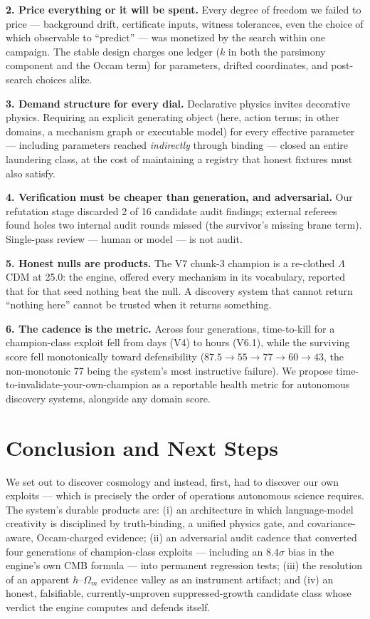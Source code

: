 \documentclass[journal]{IEEEtran}
\begin{document}
\textbf{2. Price everything or it will be spent.} Every degree of freedom we failed to
price --- background drift, certificate inputs, witness tolerances, even the choice of
which observable to ``predict'' --- was monetized by the search within one campaign.
The stable design charges one ledger ($k$ in both the parsimony component and the
Occam term) for parameters, drifted coordinates, and post-search choices alike.

\textbf{3. Demand structure for every dial.} Declarative physics invites decorative
physics. Requiring an explicit generating object (here, action terms; in other domains,
a mechanism graph or executable model) for every effective parameter --- including
parameters reached \emph{indirectly} through binding --- closed an entire laundering
class, at the cost of maintaining a registry that honest fixtures must also satisfy.

\textbf{4. Verification must be cheaper than generation, and adversarial.} Our refutation
stage discarded 2 of 16 candidate audit findings; external referees found holes two
internal audit rounds missed (the survivor's missing brane term). Single-pass review ---
human or model --- is not audit.

\textbf{5. Honest nulls are products.} The V7 chunk-3 champion is a re-clothed
$\Lambda$CDM at 25.0: the engine, offered every mechanism in its vocabulary, reported
that for that seed nothing beat the null. A discovery system that cannot return
``nothing here'' cannot be trusted when it returns something.

\textbf{6. The cadence is the metric.} Across four generations, time-to-kill for a
champion-class exploit fell from days (V4) to hours (V6.1), while the surviving score
fell monotonically toward defensibility ($87.5 \to 55 \to 77 \to 60 \to 43$, the
non-monotonic 77 being the system's most instructive failure). We propose
time-to-invalidate-your-own-champion as a reportable health metric for autonomous
discovery systems, alongside any domain score.

\section{Conclusion and Next Steps}
\label{sec:conclusion}
We set out to discover cosmology and instead, first, had to discover our own exploits
--- which is precisely the order of operations autonomous science requires. The system's
durable products are: (i) an architecture in which language-model creativity is
disciplined by truth-binding, a unified physics gate, and covariance-aware,
Occam-charged evidence; (ii) an adversarial audit cadence that converted four
generations of champion-class exploits --- including an $8.4\sigma$ bias in the engine's
own CMB formula --- into permanent regression tests; (iii) the resolution of an
apparent $h$--$\Omega_m$ evidence valley as an instrument artifact; and (iv) an honest,
falsifiable, currently-unproven suppressed-growth candidate class whose verdict the
engine computes and defends itself.
\end{document}

